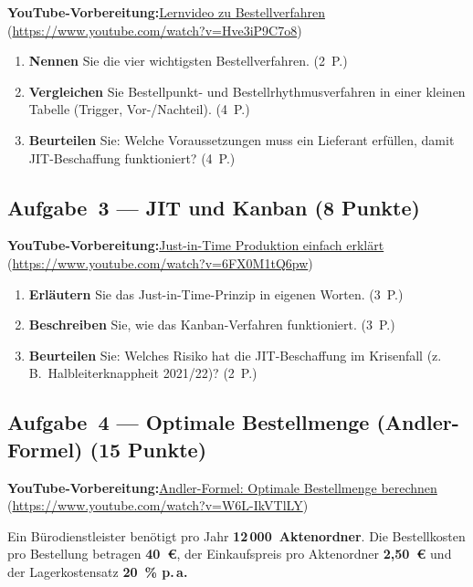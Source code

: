 \documentclass[11pt, a4paper]{article}
\begin{document}
\noindent\textbf{\color{bfwAccent}YouTube-Vorbereitung:}\enspace \href{https://www.youtube.com/watch?v=Hve3iP9C7o8}{Lernvideo zu Bestellverfahren} (\url{https://www.youtube.com/watch?v=Hve3iP9C7o8})

\medskip
\begin{enumerate}[label=(\alph*)]
  \item \textbf{Nennen} Sie die vier wichtigsten Bestellverfahren. \hfill (2~P.)
  \item \textbf{Vergleichen} Sie Bestellpunkt- und Bestellrhythmus\-verfahren in einer kleinen Tabelle (Trigger, Vor-/Nachteil). \hfill (4~P.)
  \item \textbf{Beurteilen} Sie: Welche Voraussetzungen muss ein Lieferant erfüllen, damit JIT-Beschaffung funktioniert? \hfill (4~P.)
\end{enumerate}

\subsection*{Aufgabe~3 --- JIT und Kanban (8 Punkte)}

\noindent\textbf{\color{bfwAccent}YouTube-Vorbereitung:}\enspace \href{https://www.youtube.com/watch?v=6FX0M1tQ6pw}{Just-in-Time Produktion einfach erklärt} (\url{https://www.youtube.com/watch?v=6FX0M1tQ6pw})

\medskip
\begin{enumerate}[label=(\alph*)]
  \item \textbf{Erläutern} Sie das Just-in-Time-Prinzip in eigenen Worten. \hfill (3~P.)
  \item \textbf{Beschreiben} Sie, wie das Kanban-Verfahren funktioniert. \hfill (3~P.)
  \item \textbf{Beurteilen} Sie: Welches Risiko hat die JIT-Beschaffung im Krisenfall (z.\,B.\ Halbleiterknappheit 2021/22)? \hfill (2~P.)
\end{enumerate}

\subsection*{Aufgabe~4 --- Optimale Bestellmenge (Andler-Formel) (15 Punkte)}

\noindent\textbf{\color{bfwAccent}YouTube-Vorbereitung:}\enspace \href{https://www.youtube.com/watch?v=W6L-IkVTlLY}{Andler-Formel: Optimale Bestellmenge berechnen} (\url{https://www.youtube.com/watch?v=W6L-IkVTlLY})

\medskip
Ein Bürodienstleister benötigt pro Jahr \textbf{12\,000~Aktenordner}. Die Bestellkosten
pro Bestellung betragen \textbf{40~€}, der Einkaufspreis pro Aktenordner \textbf{2{,}50~€}
und der Lagerkostensatz \textbf{20~\% p.\,a.}
\end{document}
